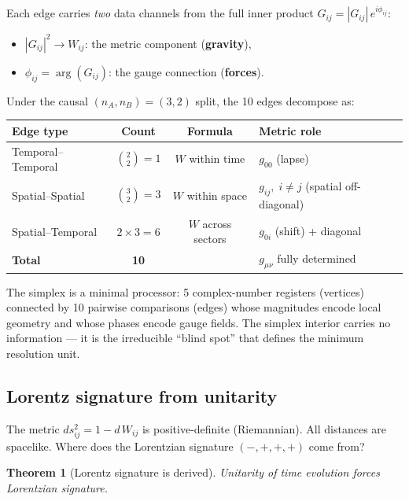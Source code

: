 \documentclass[12pt]{article}
\newtheorem{theorem}{Theorem}[section]
\theoremstyle{remark}
\theoremstyle{definition}
\begin{document}
Each edge carries \emph{two} data channels from the full inner product $G_{ij} = |G_{ij}|\,e^{i\phi_{ij}}$:
\begin{itemize}
\item $|G_{ij}|^2 \to W_{ij}$: the metric component (\textbf{gravity}),
\item $\phi_{ij} = \arg(G_{ij})$: the gauge connection (\textbf{forces}).
\end{itemize}

Under the causal $(n_A, n_B) = (3, 2)$ split, the 10 edges decompose as:

\begin{center}
\begin{tabular}{lccl}
\hline
Edge type & Count & Formula & Metric role \\
\hline
Temporal--Temporal & $\binom{2}{2} = 1$ & $W$ within time & $g_{00}$ (lapse) \\
Spatial--Spatial & $\binom{3}{2} = 3$ & $W$ within space & $g_{ij},\;i\neq j$ (spatial off-diagonal) \\
Spatial--Temporal & $2\times 3 = 6$ & $W$ across sectors & $g_{0i}$ (shift) + diagonal \\
\hline
\textbf{Total} & \textbf{10} & & $g_{\mu\nu}$ fully determined \\
\hline
\end{tabular}
\end{center}

The simplex is a minimal processor: 5 complex-number registers (vertices) connected by 10 pairwise comparisons (edges) whose magnitudes encode local geometry and whose phases encode gauge fields. The simplex interior carries no information --- it is the irreducible ``blind spot'' that defines the minimum resolution unit.

\subsection{Lorentz signature from unitarity}
\label{sec:Lorentz}

The metric $ds^2_{ij} = 1 - d\,W_{ij}$ is positive-definite (Riemannian). All distances are spacelike. Where does the Lorentzian signature $(-,+,+,+)$ come from?

\begin{theorem}[Lorentz signature is derived]
Unitarity of time evolution forces Lorentzian signature.
\end{theorem}
\end{document}
